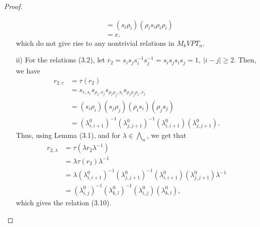 \documentclass[preprint]{elsarticle}
\begin{document}
\begin{proof}
\begin{itemize}
\begin{align*}
             &= (s_i \rho_i)(\rho_i s_i \rho_i \rho_i)\\
             &= e.
        \end{align*}
         which do not give rise to any nontrivial relations in $M_kVPT_n$.
        \item[ii)] For the relations (3.2), let $r_2= s_i s_j s_i^{-1} s_j^{-1}=s_i s_j s_i s_j=1,~|i-j|\geq2$. Then, we have
        \begin{align*}
            r_{2,e} &= \tau(r_2)\\ &= s_{e,s_i}s_{\rho_i,s_j}s_{\rho_i \rho_j,s_i}s_{\rho_i \rho_j \rho_i,s_j}\\
            &=(s_i \rho_i)(s_j \rho_j)(\rho_i s_i)(\rho_j s_j)\\
            &=(\lambda_{i,i+1}^0)^{-1} (\lambda_{j,j+1}^0)^{-1} (\lambda_{i,i+1}^0) (\lambda_{j,j+1}^0).
        \end{align*}
        Thus, using Lemma (3.1), and for $\lambda \in \bigwedge_n$, we get that
        \begin{align*}
            r_{2,\lambda} &= \tau(\lambda r_{2} \lambda^{-1}) \\&= \lambda \tau(r_{2}) \lambda^{-1}\\
            &= \lambda (\lambda_{i,i+1}^0)^{-1}(\lambda_{j,j+1}^0)^{-1} (\lambda_{i,i+1}^0) (\lambda_{j,j+1}^0) \lambda^{-1}\\
            &= (\lambda_{i,j}^0)^{-1} (\lambda_{k,l}^0)^{-1} (\lambda_{i,j}^0) (\lambda_{k,l}^0),
        \end{align*}
        which gives the relation (3.10).%


\end{itemize}
\end{proof}
\end{document}
